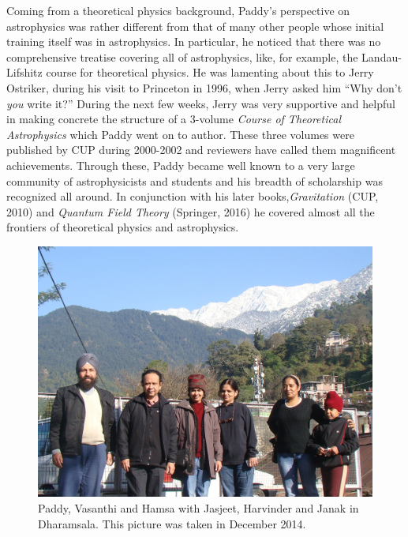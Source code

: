 \documentclass[prd, preprint, longbibliography, 11pt]{revtex4-1}
\begin{document}
Coming from a theoretical physics background, Paddy's perspective on
astrophysics was rather different from that of many other people whose
initial training itself was in astrophysics.
In particular, he noticed that there was no comprehensive treatise
covering all of astrophysics, like, for example, the Landau-Lifshitz
course for theoretical physics.
He was lamenting about this to Jerry Ostriker, during his visit to
Princeton in 1996, when  Jerry asked him ``Why don’t \textit{you}
write it?''
During the next few weeks, Jerry was very supportive and helpful in
making concrete the structure of a 3-volume \textit{Course of
  Theoretical Astrophysics} which Paddy went on to author.
These three volumes were published by CUP during 2000-2002 and
reviewers have called them magnificent achievements.
Through these, Paddy became well known to a very large community of
astrophysicists and students  and his breadth of scholarship was
recognized all around.
In conjunction with  his  later books,\textit{Gravitation} (CUP, 2010)
and  \textit{Quantum Field Theory} (Springer, 2016)  he covered almost
all the frontiers of theoretical physics and astrophysics. 
\begin{figure}
  \includegraphics[width=5truein]{paddy-dharamsala.jpg}
  \caption*{Paddy, Vasanthi and Hamsa with Jasjeet, Harvinder and Janak
    in Dharamsala.  This picture was taken in December 2014.}
\end{figure}
\end{document}
